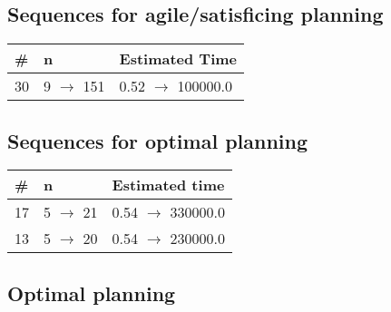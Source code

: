 \documentclass{article}
\begin{document}
                         \subsection*{Sequences for agile/satisficing planning}

                        \begin{center}
                        \begin{tabular}{@{}l|l|l@{}}
                        \# & n & Estimated Time\\\midrule
                        30&9 $\rightarrow$ 151&0.52 $\rightarrow$ 100000.0
                        \end{tabular}
                        \end{center}
                    
                            \subsection*{Sequences for optimal planning}

                            \begin{center}
                            \begin{tabular}{@{}l|l|l@{}}
                            \# & n & Estimated time\\\midrule
                            17&5 $\rightarrow$ 21&0.54 $\rightarrow$ 330000.0\\
13&5 $\rightarrow$ 20&0.54 $\rightarrow$ 230000.0
                            \end{tabular}
                            \end{center}
                    
                                \subsection*{Optimal planning}
                                
\end{document}
